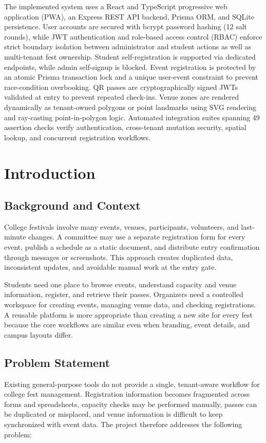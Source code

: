 \documentclass[11pt,a4paper]{report}
\begin{document}
The implemented system uses a React and TypeScript progressive web application (PWA),
an Express REST API backend, Prisma ORM, and SQLite persistence. User accounts are
secured with bcrypt password hashing (12 salt rounds), while JWT authentication and
role-based access control (RBAC) enforce strict boundary isolation between administrator
and student actions as well as multi-tenant fest ownership. Student self-registration is
supported via dedicated endpoints, while admin self-signup is blocked. Event registration
is protected by an atomic Prisma transaction lock and a unique user-event constraint to
prevent race-condition overbooking. QR passes are cryptographically signed JWTs validated
at entry to prevent repeated check-ins. Venue zones are rendered dynamically as tenant-owned
polygons or point landmarks using SVG rendering and ray-casting point-in-polygon logic.
Automated integration suites spanning 49 assertion checks verify authentication,
cross-tenant mutation security, spatial lookup, and concurrent registration workflows.

\tableofcontents
\clearpage
{}

\chapter{Introduction}
\section{Background and Context}
College festivals involve many events, venues, participants, volunteers, and last-minute
changes. A committee may use a separate registration form for every event, publish a
schedule as a static document, and distribute entry confirmation through messages or
screenshots. This approach creates duplicated data, inconsistent updates, and avoidable
manual work at the entry gate.

Students need one place to browse events, understand capacity and venue information,
register, and retrieve their passes. Organizers need a controlled workspace for creating
events, managing venue data, and checking registrations. A reusable platform is more
appropriate than creating a new site for every fest because the core workflows are
similar even when branding, event details, and campus layouts differ.

\section{Problem Statement}
Existing general-purpose tools do not provide a single, tenant-aware workflow for
college fest management. Registration information becomes fragmented across forms and
spreadsheets, capacity checks may be performed manually, passes can be duplicated or
misplaced, and venue information is difficult to keep synchronized with event data.
The project therefore addresses the following problem:
\end{document}
